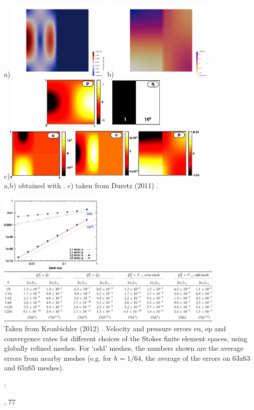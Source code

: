 \begin{center}
a)\includegraphics[width=5cm]{images/benchmark_solcx/vel}
b)\includegraphics[width=5cm]{images/benchmark_solcx/press}\\
c)\includegraphics[width=10cm]{images/benchmark_solcx/dumg11}\\
{\captionfont a,b) obtained with \aspect. c) taken from Duretz \etal (2011) \cite{dumg11}.}
\end{center}

\begin{center}
\includegraphics[width=5cm]{images/benchmark_solcx/krhb12}
\includegraphics[width=11cm]{images/benchmark_solcx/krhb12b}\\
{\captionfont Taken from Kronbichler \etal (2012) \cite{krhb12}.
Velocity and pressure errors eu, ep and convergence rates for different choices of 
the Stokes finite element spaces, using globally refined meshes. 
For `odd' meshes, the numbers shown are the average errors from nearby meshes 
(e.g. for $h=1/64$, the average of the errors on 63x63 and 65x65 meshes).}
\end{center}


\Literature: \cite{mamo08,vemmXX,demh19} 

, 77



